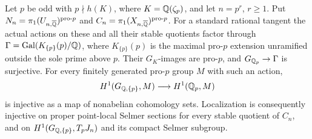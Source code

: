 \begin{proposition}
\label{prop:regular-nonabelian-localization}
Let $p$ be odd with $p\nmid h(K)$, where $K=\mathbb Q(\zeta_p)$,
and let $n=p^r$, $r\ge1$. Put
$N_n=\pi_1(U_{n,\overline{\mathbb Q}})^{\mathrm{pro}\text{-}p}$ and
$C_n=\pi_1(X_{n,\overline{\mathbb Q}})^{\mathrm{pro}\text{-}p}$.
For a standard rational tangent the actual actions on these
and all their stable quotients factor through
$\Gamma=\operatorname{Gal}(K_{\{p\}}(p)/\mathbb Q)$, where $K_{\{p\}}(p)$ is the
maximal pro-$p$ extension unramified outside the sole prime above $p$.
Their $G_K$-images are pro-$p$, and $G_{\mathbb Q_p}\to\Gamma$ is surjective.
For every finitely generated pro-$p$ group $M$ with such an action,
\[
 H^1(G_{\mathbb Q,\{p\}},M)\longrightarrow H^1(\mathbb Q_p,M)
\]
is injective as a map of nonabelian cohomology sets.
Localization is consequently injective on proper point-local
Selmer sections for every stable quotient of $C_n$, and on
$H^1(G_{\mathbb Q,\{p\}},T_pJ_n)$ and its compact Selmer subgroup.
\end{proposition}
